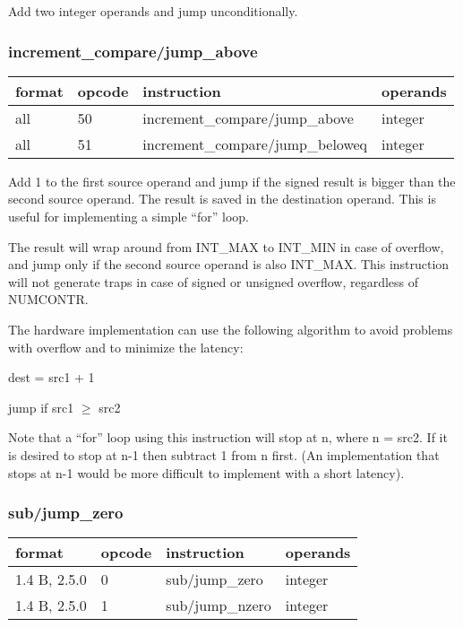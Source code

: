 \documentclass[forwardcom.tex]{subfiles}
\begin{document}
Add two integer operands and jump unconditionally.

\subsubsection{increment\_compare/jump\_above}
\label{table:addJumpInstruction}
\begin{tabular}{|p{16mm}|p{12mm}|p{60mm}|p{50mm}|}
\hline
\bfseries format & \bfseries opcode & \bfseries instruction & \bfseries operands \\ \hline
all & 50 & increment\_compare/jump\_above & integer \\ \hline
all & 51 & increment\_compare/jump\_beloweq & integer \\ \hline
\end{tabular}
\vspace{2mm}

Add 1 to the first source operand and jump if the signed result is bigger than the second source operand. The result is saved in the destination operand. This is useful for implementing a simple ``for'' loop.
\vspace{2mm}

The result will wrap around from INT\_MAX to INT\_MIN in case of overflow, and jump only if the second source operand is also INT\_MAX. This instruction will not generate traps in case of signed or unsigned overflow, regardless of NUMCONTR.
\vspace{2mm}

\vspace{2mm}

The hardware implementation can use the following algorithm to avoid problems with overflow and to minimize the latency:

dest = src1 + 1

jump if src1 $\geq$ src2
\vspace{2mm}

Note that a ``for'' loop using this instruction will stop at n, where n = src2. If it is desired to stop at n-1 then subtract 1 from n first. (An implementation that stops at n-1 would be more difficult to implement with a short latency).

\subsubsection{sub/jump\_zero}
\label{table:subJumpZeroInstruction}
\begin{tabular}{|p{20mm}|p{12mm}|p{56mm}|p{50mm}|}
\hline
\bfseries format & \bfseries opcode & \bfseries instruction & \bfseries operands \\ \hline
1.4 B, 2.5.0 &  0 & sub/jump\_zero & integer \\ \hline
1.4 B, 2.5.0 &  1 & sub/jump\_nzero  & integer\\ \hline
\end{tabular}
\vspace{2mm}
\end{document}
